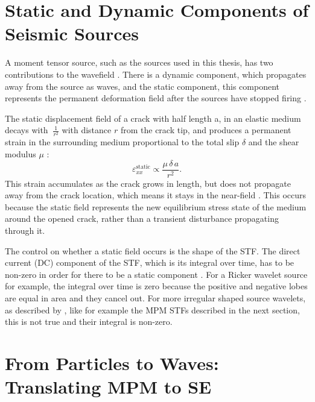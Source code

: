 \section{Static and Dynamic Components of Seismic Sources}
\label{sec:dc_static_theory}

A moment tensor source, such as the sources used in this thesis, has two contributions to the wavefield \parencite{kAkiRichards19801981}. There is a dynamic component, which propagates away from the source as waves, and the static component, this component represents the permanent deformation field after the sources have stopped firing \parencite{freundDynamicFractureMechanics1998,zhuNoteDynamicStatic2002,archambeauGeneralTheoryElastodynamic1968}. \par

The static displacement field of a crack with half length a, in an elastic medium decays with $\ \frac{1}{r^2}$ with distance $r$ from the crack tip, and produces a permanent strain in the surrounding medium proportional to the total slip $\delta$ and the shear modulus $\mu$ \parencite{freundDynamicFractureMechanics1998}:
\begin{equation}
    \varepsilon_{xx}^{\text{static}} \propto \frac{\mu\,\delta\,a}{r^2}.
\end{equation}  This strain accumulates as the crack grows in length, but does not propagate away from the crack location, which means it stays in the near-field \parencite{freundDynamicFractureMechanics1998}. This occurs because the static field represents the new equilibrium stress state of the medium around the opened crack, rather than a transient disturbance propagating through it. \par

The control on whether a static field occurs is the shape of the STF. The direct current (DC) component of the STF, which is its integral over time, has to be non-zero in order for there to be a static component \parencite{kAkiRichards19801981,zhuNoteDynamicStatic2002}. For a Ricker wavelet source for example, the integral over time is zero because the positive and negative lobes are equal in area and they cancel out. For more irregular shaped source wavelets, as described by \cite{kaganPointSourcesElastic1987,kAkiRichards19801981}, like for example the MPM STFs described in the next section, this is not true and their integral is non-zero. \par


\section{From Particles to Waves: Translating MPM to SE}
\label{sec:from_mpm_to_se}

